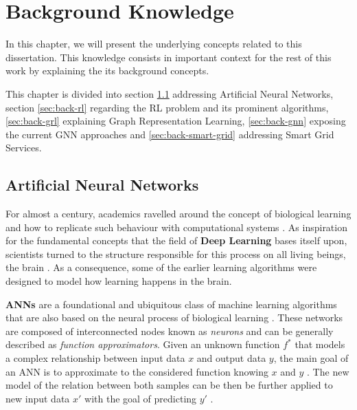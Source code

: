 \chapter{Background Knowledge} \label{chap:back}

In this chapter, we will present the underlying concepts related to this dissertation. This knowledge consists in important context for the rest of this work by explaining the its background concepts. \par
This chapter is divided into section \ref{sec:back-ann} addressing Artificial Neural Networks, section \ref{sec:back-rl} regarding the  \acf{RL} problem and its prominent algorithms, \ref{sec:back-grl} explaining Graph Representation Learning, \ref{sec:back-gnn} exposing the current \ac{GNN} approaches and \ref{sec:back-smart-grid} addressing Smart Grid Services.

\section{Artificial Neural Networks} \label{sec:back-ann}

For almost a century, academics ravelled around the concept of biological learning and how to replicate such behaviour with computational systems \cite{galuskinNeuralNetworksTheory2007, goodfellowDeepLearning2016} . As inspiration for the fundamental concepts that the field of \textbf{Deep Learning} bases itself upon, scientists turned to the structure responsible for this process on all living beings, the brain \cite{galuskinNeuralNetworksTheory2007, goodfellowDeepLearning2016}. As a consequence, some of the earlier learning algorithms were designed to model how learning happens in the brain. \par

\textbf{\acp{ANN}} are a foundational and ubiquitous class of machine learning algorithms that are also based on the neural process of biological learning \cite{galuskinNeuralNetworksTheory2007, goodfellowDeepLearning2016}. These networks are composed of interconnected nodes known as \textit{neurons} and can be generally described as \textit{function approximators}. Given an unknown function $f^*$ that models a complex relationship between input data $x$ and output data $y$, the main goal of an \ac{ANN} is to approximate to the considered function knowing $x$ and $y$ \cite{charniakIntroductionDeepLearning2018, goodfellowDeepLearning2016}. The new model of the relation between both samples can be then be further applied to new input data $x'$  with the goal of predicting $y'$ . \par

